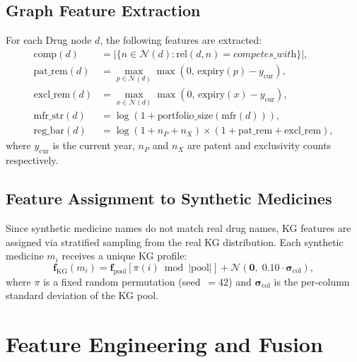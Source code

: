 \documentclass[10pt,journal,compsoc]{IEEEtran}
\begin{document}
\subsection{Graph Feature Extraction}

For each Drug node $d$, the following features are extracted:
\begin{align}
  \text{comp}(d) &= \bigl|\{n\in\mathcal{N}(d):\text{rel}(d,n)=\textit{competes\_with}\}\bigr|,
  \label{eq:comp_count}\\
  \text{pat\_rem}(d) &= \max_{p\in\mathcal{N}(d)}\max(0,\,\text{expiry}(p)-y_{\text{cur}}),
  \label{eq:pat_rem}\\
  \text{excl\_rem}(d) &= \max_{x\in\mathcal{N}(d)}\max(0,\,\text{expiry}(x)-y_{\text{cur}}),
  \label{eq:excl_rem}\\
  \text{mfr\_str}(d) &= \log\!\left(1+\text{portfolio\_size}(\text{mfr}(d))\right),
  \label{eq:mfr_str}\\
  \text{reg\_bar}(d) &= \log(1+n_P+n_X)\times(1+\text{pat\_rem}+\text{excl\_rem}),
  \label{eq:reg_bar}
\end{align}
where $y_{\text{cur}}$ is the current year, $n_P$ and $n_X$ are patent and exclusivity
counts respectively.

\subsection{Feature Assignment to Synthetic Medicines}

Since synthetic medicine names do not match real drug names, KG features are assigned
via stratified sampling from the real KG distribution.
Each synthetic medicine $m_i$ receives a unique KG profile:
\begin{equation}
  \mathbf{f}_{\text{KG}}(m_i) =
    \mathbf{f}_{\text{pool}}\!\left[\pi(i)\bmod|\text{pool}|\right]
    + \mathcal{N}(\mathbf{0},\;0.10\cdot\boldsymbol{\sigma}_{\text{col}}),
  \label{eq:kg_assign}
\end{equation}
where $\pi$ is a fixed random permutation (seed~$=42$) and
$\boldsymbol{\sigma}_{\text{col}}$ is the per-column standard deviation of the KG pool.

\section{Feature Engineering and Fusion}
\label{sec:features}
\end{document}
